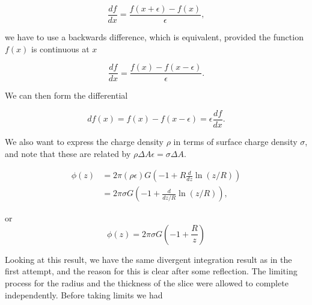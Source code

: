 \begin{equation}\label{eqn:classicalMechanicsPs2:310}
\frac{df}{dx} = \frac{f(x + \epsilon) - f(x)}{\epsilon},
\end{equation}

we have to use a backwards difference, which is equivalent, provided the function $f(x)$ is continuous at $x$

\begin{equation}\label{eqn:classicalMechanicsPs2:310b}
\frac{df}{dx} = \frac{f(x) - f(x -\epsilon)}{\epsilon}.
\end{equation}

We can then form the differential

\begin{equation}\label{eqn:qmTwoExamReflection:310c}
df(x) = f(x) - f(x -\epsilon) = \epsilon \frac{df}{dx}.
\end{equation}

We also want to express the charge density $\rho$ in terms of surface charge density $\sigma$, and note that these are related by $\rho \Delta A \epsilon = \sigma \Delta A$.

\begin{align*}
\phi(z) 
&=
2 \pi (\rho \epsilon) G 
\left( -1 + R \frac{d}{dz} \ln(z/R) \right) \\
&=
2 \pi \sigma G 
\left( -1 + \frac{d}{dz/R} \ln(z/R) \right),
\end{align*}

or
\begin{equation}\label{eqn:classicalMechanicsPs2:350}
\phi(z)
=
2 \pi \sigma G 
\left( -1 + \frac{R}{z} \right)
\end{equation}

%
%

Looking at this result, we have the same divergent integration result as in the first attempt, and the reason for this is clear after some reflection.  The limiting process for the radius and the thickness of the slice were allowed to complete independently.  Before taking limits we had

